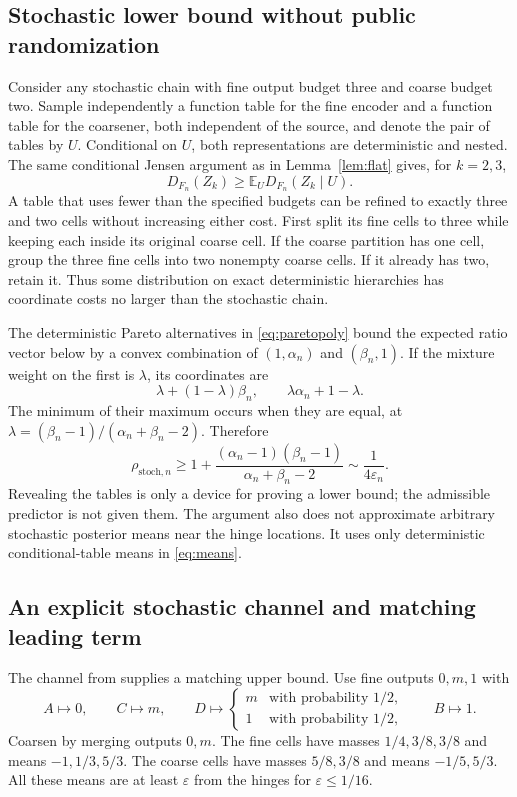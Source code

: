 \documentclass[11pt]{article}
\theoremstyle{definition}\newtheorem{definition}[theorem]{Definition}
\theoremstyle{remark}\newtheorem{remark}[theorem]{Remark}
\newcommand{\E}{\mathbb E}
\newcommand{\stp}{\mathrm{stoch}}
\begin{document}
\subsection{Stochastic lower bound without public randomization}
\label{sec:stochasticlower}
Consider any stochastic chain with fine output budget three and coarse budget two. Sample independently a function table for the fine encoder and a function table for the coarsener, both independent of the source, and denote the pair of tables by $U$. Conditional on $U$, both representations are deterministic and nested. The same conditional Jensen argument as in Lemma~\ref{lem:flat} gives, for $k=2,3$,
\begin{equation}
D_{F_n}(Z_k)\ge\E_U D_{F_n}(Z_k\mid U).
\label{eq:reveal}
\end{equation}
A table that uses fewer than the specified budgets can be refined to exactly three and two cells without increasing either cost. First split its fine cells to three while keeping each inside its original coarse cell. If the coarse partition has one cell, group the three fine cells into two nonempty coarse cells. If it already has two, retain it. Thus some distribution on exact deterministic hierarchies has coordinate costs no larger than the stochastic chain.

The deterministic Pareto alternatives in \eqref{eq:paretopoly} bound the expected ratio vector below by a convex combination of $(1,\alpha_n)$ and $(\beta_n,1)$. If the mixture weight on the first is $\lambda$, its coordinates are
\[
\lambda+(1-\lambda)\beta_n,\qquad
\lambda\alpha_n+1-\lambda.
\]
The minimum of their maximum occurs when they are equal, at
$\lambda=(\beta_n-1)/(\alpha_n+\beta_n-2)$. Therefore
\begin{equation}
\rho_{\stp,n}\ge
1+\frac{(\alpha_n-1)(\beta_n-1)}{\alpha_n+\beta_n-2}
\sim\frac1{4\varepsilon_n}.
\label{eq:stochlower}
\end{equation}
Revealing the tables is only a device for proving a lower bound; the admissible predictor is not given them. The argument also does not approximate arbitrary stochastic posterior means near the hinge locations. It uses only deterministic conditional-table means in \eqref{eq:means}.

\subsection{An explicit stochastic channel and matching leading term}
\label{sec:stochasticupper}
The channel from \cite[Lemma 4.3]{huang7} supplies a matching upper bound. Use fine outputs $0,m,1$ with
\[
A\mapsto0,\qquad C\mapsto m,\qquad
D\mapsto\begin{cases}m&\text{with probability }1/2,\\1&\text{with probability }1/2,\end{cases}
\qquad B\mapsto1.
\]
Coarsen by merging outputs $0,m$. The fine cells have masses $1/4,3/8,3/8$ and means $-1,1/3,5/3$. The coarse cells have masses $5/8,3/8$ and means $-1/5,5/3$. All these means are at least $\varepsilon$ from the hinges for $\varepsilon\le1/16$.
\end{document}

